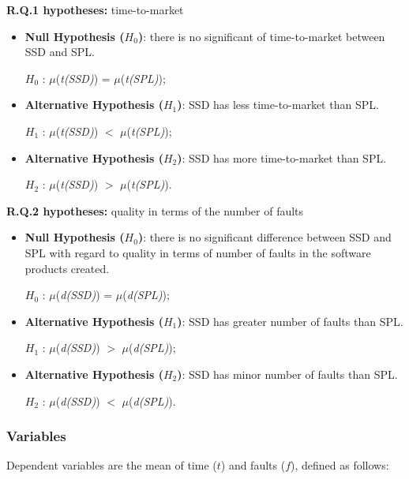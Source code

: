 \textbf{R.Q.1 hypotheses:} time-to-market

	\begin{itemize}
	
	\item \textbf{Null Hypothesis ($H_{0}$)}: there is no significant of time-to-market between SSD and SPL.
	
	$H_{0}$ : $\mu$(\textit{t(SSD)}) =  $\mu$(\textit{t(SPL)});
	
	
	\item \textbf{Alternative Hypothesis ($H_{1}$)}: SSD has less time-to-market than SPL.
	
	$H_{1}$ : $\mu$(\textit{t(SSD)}) $<$ $\mu$(\textit{t(SPL)});
		
	
	\item \textbf{Alternative Hypothesis ($H_{2}$)}: SSD has more time-to-market than SPL.
	
	$H_{2}$ :  $\mu$(\textit{t(SSD)}) $>$ $\mu$(\textit{t(SPL)}).		
	
	\end{itemize}	



\textbf{R.Q.2 hypotheses:}
quality in terms of the number of faults
	\begin{itemize}
	
	\item \textbf{Null Hypothesis ($H_{0}$)}: there is no significant difference between SSD and SPL with regard to quality in terms of number of faults in the software products created.
	
	$H_{0}$ : $\mu$(\textit{d(SSD)}) =  $\mu$(\textit{d(SPL)});
	
	
	\item \textbf{Alternative Hypothesis ($H_{1}$)}: SSD has greater number of faults than SPL.
	
	$H_{1}$ : $\mu$(\textit{d(SSD)}) $>$ $\mu$(\textit{d(SPL)});
		
	
	\item \textbf{Alternative Hypothesis ($H_{2}$)}: SSD has minor number of faults than SPL.
	
	$H_{2}$ :  $\mu$(\textit{d(SSD)}) $<$ $\mu$(\textit{d(SPL)}).		
	
	\end{itemize}


\subsubsection{Variables}

Dependent variables are the mean of time ($t$) and faults ($f$), defined as follows:

